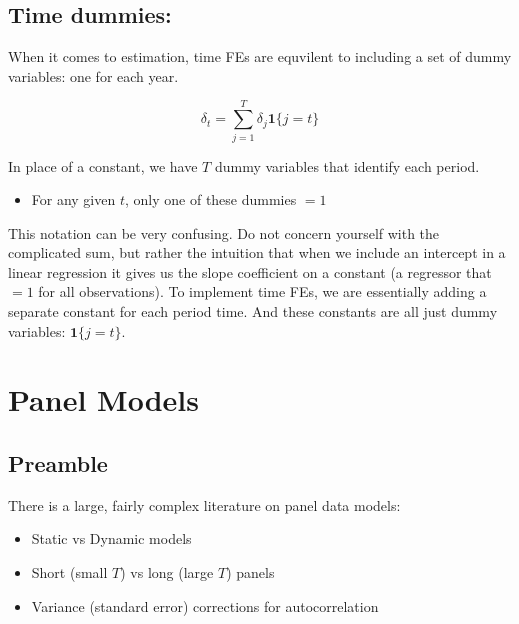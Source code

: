 \documentclass[
  letterpaper,
  DIV=11,
  numbers=noendperiod]{scrartcl}
\providecommand{\tightlist}{%
  \setlength{\itemsep}{0pt}\setlength{\parskip}{0pt}}
\begin{document}
\subsection{Time dummies:}\label{time-dummies}

When it comes to estimation, time FEs are equvilent to including a set
of dummy variables: one for each year.

\[
  \delta_t = \sum_{j=1}^{T}\delta_j \mathbf{1}\{j=t\} 
\]

In place of a constant, we have \(T\) dummy variables that identify each
period.

\begin{itemize}
\tightlist
\item
  For any given \(t\), only one of these dummies \(=1\)
\end{itemize}

\begin{tcolorbox}[enhanced jigsaw, opacitybacktitle=0.6, colbacktitle=quarto-callout-note-color!10!white, rightrule=.15mm, colframe=quarto-callout-note-color-frame, bottomtitle=1mm, breakable, leftrule=.75mm, colback=white, toprule=.15mm, toptitle=1mm, left=2mm, title=\textcolor{quarto-callout-note-color}{\faInfo}\hspace{0.5em}{Note}, coltitle=black, arc=.35mm, titlerule=0mm, bottomrule=.15mm, opacityback=0]

This notation can be very confusing. Do not concern yourself with the
complicated sum, but rather the intuition that when we include an
intercept in a linear regression it gives us the slope coefficient on a
constant (a regressor that \(=1\) for all observations). To implement
time FEs, we are essentially adding a separate constant for each period
time. And these constants are all just dummy variables:
\(\mathbf{1}\{j=t\}\).

\end{tcolorbox}

\section{Panel Models}\label{panel-models}

\subsection{Preamble}\label{preamble}

There is a large, fairly complex literature on panel data models:

\begin{itemize}
\item
  Static vs Dynamic models
\item
  Short (small \(T\)) vs long (large \(T\)) panels
\item
  Variance (standard error) corrections for autocorrelation
\end{itemize}
\end{document}
